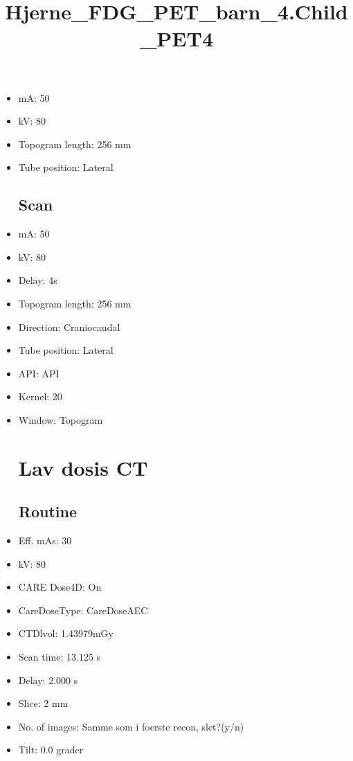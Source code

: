 \documentclass[12pt]{article}
\title{Hjerne\_FDG\_PET\_barn\_4.Child\_PET4}
\begin{document}
\maketitle
\newpage
\tableofcontents
\newpage
{}


\begin{itemize}[noitemsep]\section{Topogram}
\subsection{Routine}
\item mA: 50\item kV: 80\item Topogram length: 256 mm\item Tube position: Lateral
\subsection{Scan}\item mA: 50\item kV: 80\item Delay: 4s\item Topogram length: 256 mm\item Direction: Craniocaudal\item Tube position: Lateral\item API: API \item Kernel: 20\item Window: Topogram
\section{Lav dosis CT}
\subsection{Routine}
\item Eff. mAs: 30\item kV: 80\item CARE Dose4D: On\item CareDoseType: CareDoseAEC\item CTDlvol: 1.43979mGy\item Scan time: 13.125 s\item Delay: 2.000 s\item Slice: 2 mm\item No. of images: Samme som i foerste recon, slet?(y/n)\item Tilt: 0.0 grader

\end{itemize}
\end{document}
